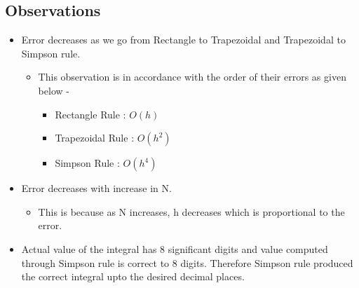 \documentclass[12pt]{article}
\begin{document}
\subsection{Observations}
\begin{itemize}
  \item Error decreases as we go from Rectangle to Trapezoidal and Trapezoidal to Simpson rule.

  \begin{itemize}
  \item This observation is in accordance with the order of their errors as given below - 
  	\begin{itemize}
  		\item Rectangle Rule : $O(h)$
  		\item Trapezoidal Rule : $O(h^2)$
  		\item Simpson Rule : $O(h^4)$
  	\end{itemize}
  \end{itemize}

  \item Error decreases with increase in N.
  	\begin{itemize}
  		\item This is because as N increases, h decreases which is proportional to the error.
  	\end{itemize}
  \item Actual value of the integral has 8 significant digits and value computed through Simpson rule is correct to 8 digits. Therefore Simpson rule produced the correct integral upto the desired decimal places.
\end{itemize}

\clearpage
\section{}
\end{document}
